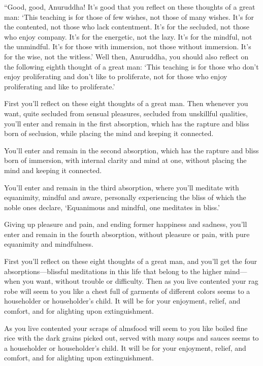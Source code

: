\documentclass[12pt,openany]{book}%
\begin{document}
“Good, good, Anuruddha! It’s good that you reflect on these thoughts of a great man: ‘This teaching is for those of few wishes, not those of many wishes. It’s for the contented, not those who lack contentment. It’s for the secluded, not those who enjoy company. It’s for the energetic, not the lazy. It’s for the mindful, not the unmindful. It’s for those with immersion, not those without immersion. It’s for the wise, not the witless.’ Well then, Anuruddha, you should also reflect on the following eighth thought of a great man: ‘This teaching is for those who don’t enjoy proliferating and don’t like to proliferate, not for those who enjoy proliferating and like to proliferate.’ 

First you’ll reflect on these eight thoughts of a great man. Then whenever you want, quite secluded from sensual pleasures, secluded from unskillful qualities, you’ll enter and remain in the first absorption, which has the rapture and bliss born of seclusion, while placing the mind and keeping it connected. 

You’ll enter and remain in the second absorption, which has the rapture and bliss born of immersion, with internal clarity and mind at one, without placing the mind and keeping it connected. 

You’ll enter and remain in the third absorption, where you’ll meditate with equanimity, mindful and aware, personally experiencing the bliss of which the noble ones declare, ‘Equanimous and mindful, one meditates in bliss.’ 

Giving up pleasure and pain, and ending former happiness and sadness, you’ll enter and remain in the fourth absorption, without pleasure or pain, with pure equanimity and mindfulness. 

First you’ll reflect on these eight thoughts of a great man, and you’ll get the four absorptions—blissful meditations in this life that belong to the higher mind—when you want, without trouble or difficulty. Then as you live contented your rag robe will seem to you like a chest full of garments of different colors seems to a householder or householder’s child. It will be for your enjoyment, relief, and comfort, and for alighting upon extinguishment. 

As you live contented your scraps of almsfood will seem to you like boiled fine rice with the dark grains picked out, served with many soups and sauces seems to a householder or householder’s child. It will be for your enjoyment, relief, and comfort, and for alighting upon extinguishment. 
\end{document}

